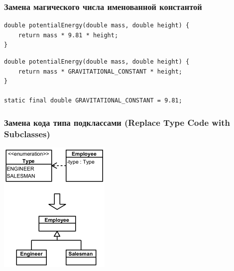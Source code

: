 \documentclass{../../slides-style}
\begin{document}
    \begin{frame}[fragile]
        \frametitle{Замена магического числа именованной константой}
        \begin{verbatim}
double potentialEnergy(double mass, double height) {
    return mass * 9.81 * height;
}
        \end{verbatim}
        
        \hspace{2cm}{\Huge{$\Downarrow$}}
        
        \begin{verbatim}
double potentialEnergy(double mass, double height) {
    return mass * GRAVITATIONAL_CONSTANT * height;
}

static final double GRAVITATIONAL_CONSTANT = 9.81;
        \end{verbatim}
    \end{frame}

    \begin{frame}
        \frametitle{Замена кода типа подклассами (Replace Type Code with Subclasses)}
        \begin{center}
            \includegraphics[width=0.4\textwidth]{replaceTypeCodeWithSubclass.png}
        \end{center}
    \end{frame}
\end{document}

